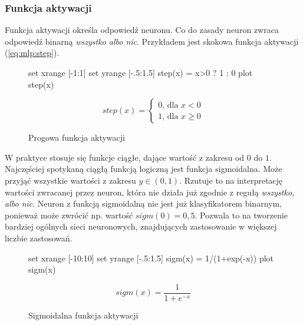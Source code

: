 \documentclass[a4paper,12pt,twoside,openany]{report}
\newcommand{\Eq}[1]{(\ref{#1})}
\begin{document}
\subsubsection{Funkcja aktywacji}
Funkcja aktywacji określa odpowiedź neuronu.
Co do zasady neuron zwraca odpowiedź binarną \textit{wszystko albo nic}.
Przykładem jest skokowa funkcja aktywacji \Eq{eq:mlp:step}.
\begin{figure}[h]
	\label{wyk:mlp:step}
	\centering
	\begin{gnuplot}[terminal=pdf,terminaloptions=color]
		set xrange [-1:1] 
		set yrange [-.5:1.5]
		step(x) = x>0 ? 1 : 0
		plot step(x)
	\end{gnuplot}
	\begin{equation}
		step(x)={\begin{cases}0{\text{, dla }}x<0\\1{\text{, dla }}x\geq 0\end{cases}}
	\end{equation}
	\caption{Progowa funkcja aktywacji}
\end{figure}

W praktyce stosuje się funkcje ciągłe, dające wartość z zakresu od $0$ do $1$.
Najczęściej spotykaną ciągłą funkcją logiczną jest funkcja sigmoidalna.
Może przyjąć wszystkie wartości z zakresu $y \in (0,1)$.
Rzutuje to na interpretację wartości zwracanej przez neuron,
która nie działa już zgodnie z regułą \textit{wszystko, albo nic}.
Neuron z funkcją sigmoidalną nie jest już klasyfikatorem binarnym, ponieważ może zwrócić np. wartość $sigm(0) = 0,5$.
Pozwala to na tworzenie bardziej ogólnych sieci neuronowych, znajdujących zastosowanie w większej liczbie zastosowań.


\begin{figure}[h]
	\label{wyk:mlp:sigm}
	\centering
	\begin{gnuplot}[terminal=pdf,terminaloptions=color]
		set xrange [-10:10] 
		set yrange [-.5:1.5]
		sigm(x) = 1/(1+exp(-x))
		plot sigm(x)
	\end{gnuplot}
	\begin{equation}
		sigm(x)=\frac{1}{1+e^{-x}}
	\end{equation}
	\caption{Sigmoidalna funkcja aktywacji}
\end{figure}
\end{document}
